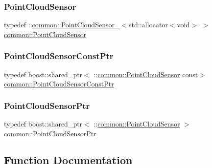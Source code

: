 \mbox{\label{namespacecommon_a493470d1acdb35b20776bd075266358e}} 
\subsubsection{\texorpdfstring{Point\+Cloud\+Sensor}{PointCloudSensor}}
{\footnotesize\ttfamily typedef \+::\hyperlink{structcommon_1_1PointCloudSensor__}{common\+::\+Point\+Cloud\+Sensor\+\_\+}$<$std\+::allocator$<$void$>$ $>$ \hyperlink{namespacecommon_a493470d1acdb35b20776bd075266358e}{common\+::\+Point\+Cloud\+Sensor}}

\mbox{\label{namespacecommon_ab9d5f19cc1df76e97ea53d81e8eb3d87}} 
\subsubsection{\texorpdfstring{Point\+Cloud\+Sensor\+Const\+Ptr}{PointCloudSensorConstPtr}}
{\footnotesize\ttfamily typedef boost\+::shared\+\_\+ptr$<$ \+::\hyperlink{namespacecommon_a493470d1acdb35b20776bd075266358e}{common\+::\+Point\+Cloud\+Sensor} const$>$ \hyperlink{namespacecommon_ab9d5f19cc1df76e97ea53d81e8eb3d87}{common\+::\+Point\+Cloud\+Sensor\+Const\+Ptr}}

\mbox{\label{namespacecommon_a7d3f864e41d4e734cba72e7ae91a0b9e}} 
\subsubsection{\texorpdfstring{Point\+Cloud\+Sensor\+Ptr}{PointCloudSensorPtr}}
{\footnotesize\ttfamily typedef boost\+::shared\+\_\+ptr$<$ \+::\hyperlink{namespacecommon_a493470d1acdb35b20776bd075266358e}{common\+::\+Point\+Cloud\+Sensor} $>$ \hyperlink{namespacecommon_a7d3f864e41d4e734cba72e7ae91a0b9e}{common\+::\+Point\+Cloud\+Sensor\+Ptr}}



\subsection{Function Documentation}
\mbox{\label{namespacecommon_ab204ea7eb40246b726341e9d9ed63520}} 
